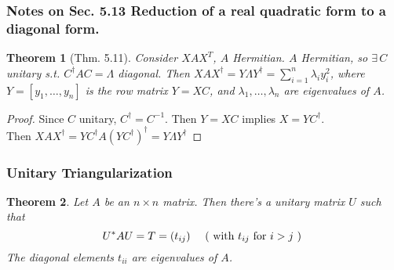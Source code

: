 \documentclass[twoside]{amsart}
\theoremstyle{plain}
\newtheorem{theorem}{Theorem}
\theoremstyle{definition}
\begin{document}
\subsubsection{Notes on Sec. 5.13 Reduction of a real quadratic form to a diagonal form.}
\begin{theorem}[Thm. 5.11] Consider $XAX^T$, $A$ Hermitian.  $A$ Hermitian, so $\exists \, C$ unitary s.t. $C^{\dag} AC = \Lambda$ diagonal.  Then $XAX^{\dag} = Y \Lambda Y^{\dag} = \sum_{i=1}^n \lambda_i y_i^2$, where $Y = [y_1, \dots, y_n]$ is the row matrix $Y=XC$, and $\lambda_1, \dots, \lambda_n$ are eigenvalues of $A$.  
\end{theorem}
\begin{proof}
  Since $C$ unitary, $C^{\dag} = C^{-1}$.  Then $Y=XC$ implies $X=YC^{\dag}$.  \\
  Then $XAX^{\dag} = YC^{\dag} A (YC^{\dag})^{\dag} = Y \Lambda Y^{\dag}$
\end{proof}


\subsubsection{ Unitary Triangularization }\label{subsubS:Unitary_Triangularization}
\begin{theorem}\label{T:Unitary_Triangularization}
  Let $A$ be an $n \times n$ matrix.  Then there's a unitary matrix $U$ such that 
  \begin{equation}\label{E:Unitary_Triangularization}
U^* AU = T = (t_{ij}) \quad \text{ ( with $t_{ij}$ for $ i > j$ ) } 
  \end{equation}
The diagonal elements $t_{ii}$ are eigenvalues of $A$.
\end{theorem}
\end{document}
